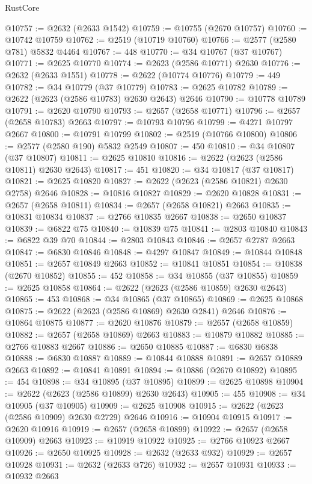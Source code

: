 \begin{lexlean}{RustCore}
\begin{coremodule}
@10757 := @2632 (@2633 @1542)
@10759 := @10755 (@2670 @10757)
@10760 := @10742 @10759
@10762 := @2519 (@10719 @10760)
@10766 := @2577 (@2580 @781) @5832 @4464
@10767 := 448
@10770 := @34 @10767 (@37 @10767)
@10771 := @2625 @10770
@10774 := @2623 (@2586 @10771) @2630
@10776 := @2632 (@2633 @1551)
@10778 := @2622 (@10774 @10776)
@10779 := 449
@10782 := @34 @10779 (@37 @10779)
@10783 := @2625 @10782
@10789 := @2622 (@2623 (@2586 @10783) @2630 @2643) @2646
@10790 := @10778 @10789
@10791 := @2620 @10790
@10793 := @2657 (@2658 @10771)
@10796 := @2657 (@2658 @10783) @2663
@10797 := @10793 @10796
@10799 := @4271 @10797 @2667
@10800 := @10791 @10799
@10802 := @2519 (@10766 @10800)
@10806 := @2577 (@2580 @190) @5832 @2549
@10807 := 450
@10810 := @34 @10807 (@37 @10807)
@10811 := @2625 @10810
@10816 := @2622 (@2623 (@2586 @10811) @2630 @2643)
@10817 := 451
@10820 := @34 @10817 (@37 @10817)
@10821 := @2625 @10820
@10827 := @2622 (@2623 (@2586 @10821) @2630 @2758) @2646
@10828 := @10816 @10827
@10829 := @2620 @10828
@10831 := @2657 (@2658 @10811)
@10834 := @2657 (@2658 @10821) @2663
@10835 := @10831 @10834
@10837 := @2766 @10835 @2667
@10838 := @2650 @10837
@10839 := @6822 @75
@10840 := @10839 @75
@10841 := @2803 @10840
@10843 := @6822 @39 @70
@10844 := @2803 @10843
@10846 := @2657 @2787 @2663
@10847 := @6830 @10846
@10848 := @4297 @10847
@10849 := @10844 @10848
@10851 := @2657 @10849 @2663
@10852 := @10841 @10851
@10854 := @10838 (@2670 @10852)
@10855 := 452
@10858 := @34 @10855 (@37 @10855)
@10859 := @2625 @10858
@10864 := @2622 (@2623 (@2586 @10859) @2630 @2643)
@10865 := 453
@10868 := @34 @10865 (@37 @10865)
@10869 := @2625 @10868
@10875 := @2622 (@2623 (@2586 @10869) @2630 @2841) @2646
@10876 := @10864 @10875
@10877 := @2620 @10876
@10879 := @2657 (@2658 @10859)
@10882 := @2657 (@2658 @10869) @2663
@10883 := @10879 @10882
@10885 := @2766 @10883 @2667
@10886 := @2650 @10885
@10887 := @6830 @6838
@10888 := @6830 @10887
@10889 := @10844 @10888
@10891 := @2657 @10889 @2663
@10892 := @10841 @10891
@10894 := @10886 (@2670 @10892)
@10895 := 454
@10898 := @34 @10895 (@37 @10895)
@10899 := @2625 @10898
@10904 := @2622 (@2623 (@2586 @10899) @2630 @2643)
@10905 := 455
@10908 := @34 @10905 (@37 @10905)
@10909 := @2625 @10908
@10915 := @2622 (@2623 (@2586 @10909) @2630 @2729) @2646
@10916 := @10904 @10915
@10917 := @2620 @10916
@10919 := @2657 (@2658 @10899)
@10922 := @2657 (@2658 @10909) @2663
@10923 := @10919 @10922
@10925 := @2766 @10923 @2667
@10926 := @2650 @10925
@10928 := @2632 (@2633 @932)
@10929 := @2657 @10928
@10931 := @2632 (@2633 @726)
@10932 := @2657 @10931
@10933 := @10932 @2663

\end{coremodule}
\end{lexlean}
